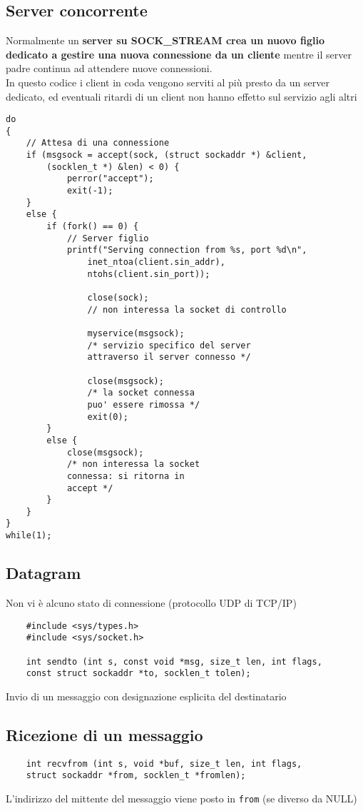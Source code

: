 \documentclass[italian,12pt,a4paper]{article}
\begin{document}
\subsection{Server concorrente}
Normalmente un \textbf{server su SOCK\_STREAM crea un nuovo figlio dedicato a gestire una nuova connessione da un cliente} mentre il server padre continua ad attendere nuove connessioni.\\
In questo codice i client in coda vengono serviti al più presto da un server dedicato, ed eventuali ritardi di un client non hanno effetto sul servizio agli altri
\begin{lstlisting}[xleftmargin=-2cm]
do
{
	// Attesa di una connessione
	if (msgsock = accept(sock, (struct sockaddr *) &client, 
		(socklen_t *) &len) < 0) {
			perror("accept");
			exit(-1);
	}
	else {
		if (fork() == 0) {
			// Server figlio
			printf("Serving connection from %s, port %d\n",
				inet_ntoa(client.sin_addr), 
				ntohs(client.sin_port));
				
				close(sock); 
				// non interessa la socket di controllo
				
				myservice(msgsock);
				/* servizio specifico del server 
				attraverso il server connesso */
				
				close(msgsock);
				/* la socket connessa
				puo' essere rimossa */
				exit(0);
		}
		else {
			close(msgsock);
			/* non interessa la socket
			connessa: si ritorna in 
			accept */
		}
	}
}
while(1);
\end{lstlisting}  
\newpage
\subsection{Datagram}
Non vi è alcuno stato di connessione (protocollo UDP di TCP/IP)
\begin{verbatim}
	#include <sys/types.h>
	#include <sys/socket.h>
	
	int sendto (int s, const void *msg, size_t len, int flags, 
	const struct sockaddr *to, socklen_t tolen);
\end{verbatim}
Invio di un messaggio con designazione esplicita del destinatario
\subsection{Ricezione di un messaggio}
\begin{verbatim}
	int recvfrom (int s, void *buf, size_t len, int flags, 
	struct sockaddr *from, socklen_t *fromlen);
\end{verbatim}
L'indirizzo del mittente del messaggio viene posto in \verb|from| (se diverso da NULL)
\end{document}
